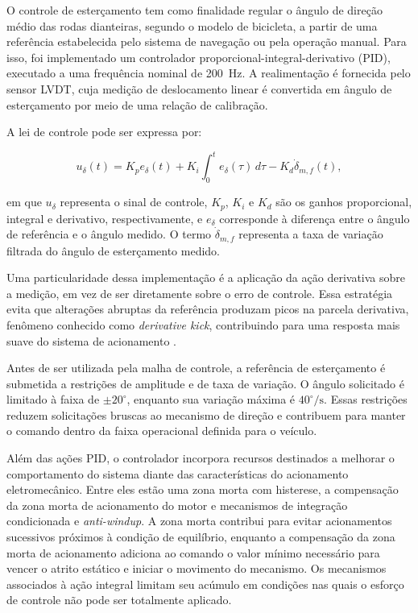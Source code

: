 O controle de esterçamento tem como finalidade regular o ângulo de direção médio das rodas dianteiras, segundo o modelo de bicicleta, a partir de uma referência estabelecida pelo sistema de navegação ou pela operação manual. Para isso, foi implementado um controlador proporcional-integral-derivativo (PID), executado a uma frequência nominal de 200~Hz. A realimentação é fornecida pelo sensor LVDT, cuja medição de deslocamento linear é convertida em ângulo de esterçamento por meio de uma relação de calibração.

A lei de controle pode ser expressa por:

\begin{equation}
u_{\delta}(t) =
K_p e_{\delta}(t)
+ K_i \int_0^t e_{\delta}(\tau)\,d\tau
- K_d \dot{\delta}_{m,f}(t),
\end{equation}

em que $u_{\delta}$ representa o sinal de controle, $K_p$, $K_i$ e $K_d$ são os ganhos proporcional, integral e derivativo, respectivamente, e $e_{\delta}$ corresponde à diferença entre o ângulo de referência e o ângulo medido. O termo $\dot{\delta}_{m,f}$ representa a taxa de variação filtrada do ângulo de esterçamento medido.

Uma particularidade dessa implementação é a aplicação da ação derivativa sobre a medição, em vez de ser diretamente sobre o erro de controle. Essa estratégia evita que alterações abruptas da referência produzam picos na parcela derivativa, fenômeno conhecido como \textit{derivative kick}, contribuindo para uma resposta mais suave do sistema de acionamento \citep{AstromHagglund2006}. 

Antes de ser utilizada pela malha de controle, a referência de esterçamento é submetida a restrições de amplitude e de taxa de variação. O ângulo solicitado é limitado à faixa de $\pm20^\circ$, enquanto sua variação máxima é $40^\circ/\mathrm{s}$. Essas restrições reduzem solicitações bruscas ao mecanismo de direção e contribuem para manter o comando dentro da faixa operacional definida para o veículo.

Além das ações PID, o controlador incorpora recursos destinados a melhorar o comportamento do sistema diante das características do acionamento eletromecânico. Entre eles estão uma zona morta com histerese, a compensação da zona morta de acionamento do motor e mecanismos de integração condicionada e \textit{anti-windup}. A zona morta contribui para evitar acionamentos sucessivos próximos à condição de equilíbrio, enquanto a compensação da zona morta de acionamento adiciona ao comando o valor mínimo necessário para vencer o atrito estático e iniciar o movimento do mecanismo. Os mecanismos associados à ação integral limitam seu acúmulo em condições nas quais o esforço de controle não pode ser totalmente aplicado.

